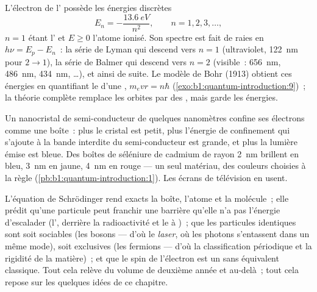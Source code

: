 \begin{proposition}\label{prop:b1:quantum-introduction:hydrogen}
L'électron de l' possède les énergies discrètes
\[
E_n = -\frac{\qty{13.6}{eV}}{n^2} , \qquad n = 1, 2, 3, \ldots ,
\]
$n = 1$ étant l' et $E \geq 0$ l'atome ionisé. Son
spectre est fait de raies en $h\nu = E_p - E_n$~: la série de Lyman qui
descend vers $n = 1$ (ultraviolet, \qty{122}{nm} pour $2 \to 1$), la série
de Balmer qui descend vers $n = 2$ (visible~: \qty{656}{nm}, \qty{486}{nm}, \qty{434}{nm}, \ldots),
et ainsi de suite. Le modèle de Bohr (1913) obtient ces énergies en
quantifiant le  d'une , $m_evr = n\hbar$
(\cref{exo:b1:quantum-introduction:9})~; la théorie complète remplace les
orbites par des , mais garde les énergies.
\end{proposition}
\admitted

\begin{example}\label{ex:b1:quantum-introduction:dot}
Un nanocristal de semi-conducteur de quelques nanomètres confine ses
électrons comme une boîte~: plus le cristal est petit, plus l'énergie de
confinement qui s'ajoute à la bande interdite du semi-conducteur est
grande, et plus la lumière émise est bleue. Des boîtes de séléniure de
cadmium de rayon \qty{2}{nm} brillent en bleu, \qty{3}{nm} en jaune,
\qty{4}{nm} en rouge --- un seul matériau, des couleurs choisies à la
règle (\cref{pb:b1:quantum-introduction:1}). Les écrans de télévision en usent.
\end{example}

\begin{remark}\label{rem:b1:quantum-introduction:rest}
L'équation de Schrödinger rend exacts la boîte, l'atome et la molécule~;
elle prédit qu'une particule peut franchir une barrière qu'elle n'a pas
l'énergie d'escalader (l'\emph{}, derrière la radioactivité et
le  à )~; que les particules identiques sont soit
sociables (les bosons --- d'où le \emph{laser}, où les photons s'entassent
dans un même mode), soit exclusives (les fermions --- d'où la
classification périodique et la rigidité de la matière)~; et que le spin
de l'électron est un  sans équivalent classique. Tout
cela relève du volume de deuxième année et au-delà~; tout cela repose sur
les quelques idées de ce chapitre.
\end{remark}

